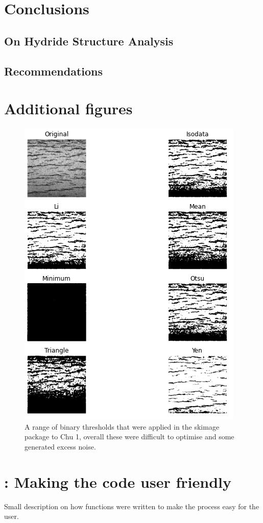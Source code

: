 \documentclass{article}
\begin{document}
\section{Conclusions}
\subsection{On Hydride Structure Analysis}

\subsection{Recommendations}

\newpage



\newpage
\appendix
\section{Additional figures}

\begin{figure}[h]
	    \centering
	    \includegraphics[scale=0.7]{Figures/skimage_thresholds.png}
	    \caption{A range of binary thresholds that were applied in the skimage package to Chu 1, overall these were difficult to optimise and some generated excess noise.}
	    \label{fig:skimage_threshold}
	\end{figure}
	
\section{: Making the code user friendly}
Small description on how functions were written to make the process easy for the user.
\end{document}
